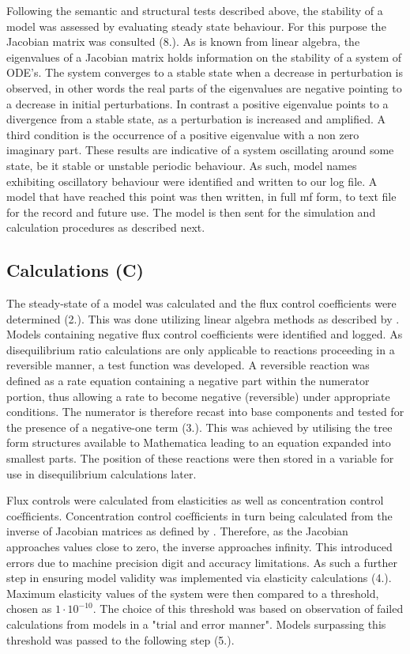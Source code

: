 Following the semantic and structural tests described above, the stability of a model was assessed by evaluating steady state behaviour. For this purpose the Jacobian matrix was consulted (8.). As is known from linear algebra, the eigenvalues of a Jacobian matrix holds information on the stability of a system of ODE's. The system converges to a stable state when a decrease in perturbation is observed, in other words the real parts of the eigenvalues are negative pointing to a decrease in initial perturbations. In contrast a positive eigenvalue points to a divergence from a stable state, as a perturbation is increased and amplified. A third condition is the occurrence of a positive eigenvalue with a non zero imaginary part. These results are indicative of a system oscillating around some state, be it stable or unstable periodic behaviour. As such, model names exhibiting oscillatory behaviour were identified and written to our log file. A model that have reached this point was then written, in full mf form, to text file for the record and future use. The model is then sent for the simulation and calculation procedures as described next.

\subsection{Calculations (C)} \label{Calculations}
The \gls{steady-state} of a model was calculated and the flux control coefficients were determined (2.). This was done utilizing linear algebra methods as described by \citeauthor{Hofmeyr2001}. Models containing negative flux control coefficients were identified and logged. As disequilibrium ratio calculations are only applicable to reactions proceeding in a reversible manner, a test function was developed. A reversible reaction was defined as a rate equation containing a negative part within the numerator portion, thus allowing a rate to become negative (reversible) under appropriate conditions. The numerator is therefore recast into base components and tested for the presence of a negative-one term (3.). This was achieved by utilising the tree form structures available to Mathematica leading to an equation expanded into smallest parts. The position of these reactions were then stored in a variable for use in disequilibrium calculations later. 

Flux controls were calculated from elasticities as well as concentration control coe\"fficients. Concentration control coe\"fficients in turn being calculated from the inverse of Jacobian matrices as defined by \citeauthor{Hofmeyr2001}. Therefore, as the Jacobian approaches values close to zero, the inverse approaches infinity. This introduced errors due to machine precision digit and accuracy limitations. As such a further step in ensuring model validity was implemented via elasticity calculations (4.). Maximum elasticity values of the system were then compared to a threshold, chosen as $1 \cdot 10^{-10}$. The choice of this threshold was based on observation of failed calculations from models in a "trial and error manner".  Models surpassing this threshold was passed to the following step (5.). 

